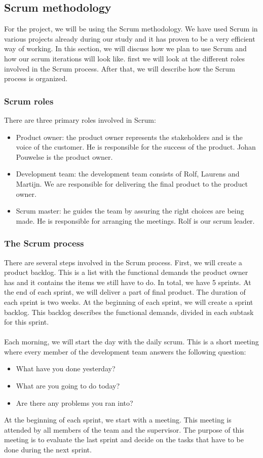\subsection{Scrum methodology}
For the project, we will be using the Scrum methodology. We have used Scrum in various projects already during our study and it has proven to be a very efficient way of working. In this section, we will discuss how we plan to use Scrum and how our scrum iterations will look like. first we will  look at the different roles involved in the Scrum process. After that, we will describe how the Scrum process is organized.

\subsubsection{Scrum roles}
There are three primary roles involved in Scrum:
\begin{itemize}
\item Product owner: the product owner represents the stakeholders and is the voice of the customer. He is responsible for the success of the product. Johan Pouwelse is the product owner.
\item Development team: the development team consists of Rolf, Laurens and Martijn. We are responsible for delivering the final product to the product owner.
\item Scrum master: he guides the team by assuring the right choices are being made. He is responsible for arranging the meetings. Rolf is our scrum leader.
\end{itemize}

\subsubsection{The Scrum process}
There are several steps involved in the Scrum process. First, we will create a product backlog. This is a list with the functional demands the product owner has and it contains the items we still have to do. In total, we have 5 sprints. At the end of each sprint, we will deliver a part of final product. The duration of each sprint is two weeks. At the beginning of each sprint, we will create a sprint backlog. This backlog describes the functional demands, divided in each subtask for this sprint.\\\\
Each morning, we will start the day with the daily scrum. This is a short meeting where every member of the development team answers the following question:
\begin{itemize}
\item What have you done yesterday?
\item What are you going to do today?
\item Are there any problems you ran into?
\end{itemize}
At the beginning of each sprint, we start with a meeting. This meeting is attended by all members of the team and the supervisor. The purpose of this meeting is to evaluate the last sprint and decide on the tasks that have to be done during the next sprint.

